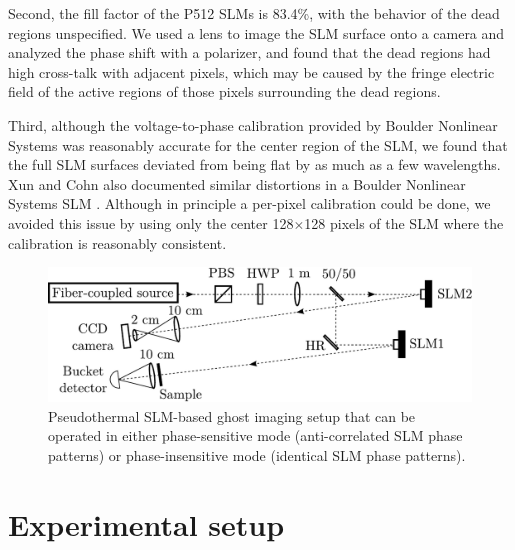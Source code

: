 Second, the fill factor of the P512 SLMs is 83.4\%, with the behavior of the dead regions unspecified. We used a lens to image the SLM surface onto a camera and analyzed the phase shift with a polarizer, and found that the dead regions had high cross-talk with adjacent pixels, which may be caused by the fringe electric field of the active regions of those pixels surrounding the dead regions.

Third, although the voltage-to-phase calibration provided by Boulder Nonlinear Systems was reasonably accurate for the center region of the SLM, we found that the full SLM surfaces deviated from being flat by as much as a few wavelengths. Xun and Cohn also documented similar distortions in a Boulder Nonlinear Systems SLM \cite{xun-phase}. Although in principle a per-pixel calibration could be done, we avoided this issue by using only the center 128$\times$128 pixels of the SLM where the calibration is reasonably consistent.

\begin{figure}[t]
\begin{center}
\includegraphics[width=13cm]{figure-ghost-setup.pdf}
\caption{Pseudothermal SLM-based ghost imaging setup that can be operated in either phase-sensitive mode (anti-correlated SLM phase patterns) or phase-insensitive mode (identical SLM phase patterns).}
\label{figure:ghost-setup}
\end{center}
\end{figure}


\section{Experimental setup}

